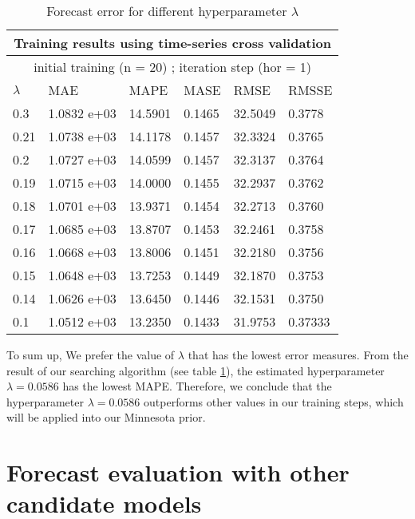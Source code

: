 \documentclass{monashthesis}
\begin{document}
\begin{table}[h]
\begin{center}
\begin{tabular}{|p{2cm}|p{2cm}|p{2cm}|p{2cm}|p{2cm}|p{2cm}|}
\hline\hline
\multicolumn{6}{|c|}{Training results using time-series cross validation}\\
\hline
\multicolumn{6}{|c|}{initial training (n = 20) ; iteration step (hor = 1)}\\
\hline\hline
 $\lambda$    & MAE         & MAPE    & MASE   & RMSE    & RMSSE  \\
\hline\hline
0.3  & 1.0832 e+03 & 14.5901 & 0.1465 & 32.5049 & 0.3778 \\
0.21 & 1.0738 e+03 & 14.1178 & 0.1457 & 32.3324 & 0.3765 \\
0.2  & 1.0727 e+03 & 14.0599 & 0.1457 & 32.3137 & 0.3764 \\
0.19 & 1.0715 e+03 & 14.0000 & 0.1455 & 32.2937 & 0.3762 \\
0.18 & 1.0701 e+03 & 13.9371 & 0.1454 & 32.2713 & 0.3760 \\
0.17 & 1.0685 e+03 & 13.8707 & 0.1453 & 32.2461 & 0.3758 \\
0.16 & 1.0668 e+03 & 13.8006 & 0.1451 & 32.2180 & 0.3756 \\
0.15 & 1.0648 e+03 & 13.7253 & 0.1449 & 32.1870 & 0.3753 \\
0.14 & 1.0626 e+03 & 13.6450 & 0.1446 & 32.1531 & 0.3750 \\
0.1  & 1.0512 e+03 & 13.2350 & 0.1433 & 31.9753 & 0.37333\\
\hline\hline
\end{tabular}
\end{center}
\caption{Forecast error for different hyperparameter $\lambda$}
\label{testres}
\end{table}

To sum up, We prefer the value of \(\lambda\) that has the lowest error measures. From the result of our searching algorithm (see table \ref{testres}), the estimated hyperparameter \(\lambda=0.0586\) has the lowest MAPE. Therefore, we conclude that the hyperparameter \(\lambda=0.0586\) outperforms other values in our training steps, which will be applied into our Minnesota prior.

\hypertarget{forecast-evaluation-with-other-candidate-models}{%
\section{Forecast evaluation with other candidate models}\label{forecast-evaluation-with-other-candidate-models}}
\end{document}
